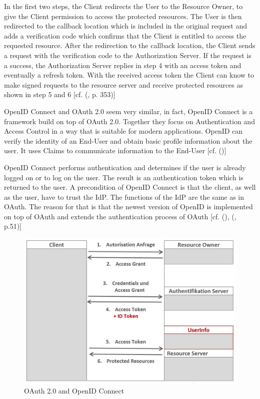 {{{	In the first two steps, the Client redirects the User to the Resource Owner, to give the Client permission to access the protected resources. The User is then redirected to the callback location which is included in the original request and adds a verification code which confirms that the Client is entitled to access the requested resource. After the redirection to the callback location, the Client sends a request with the verification code to the Authorization Server. If the request is a success, the Authorization Server replies in step 4 with an access token and eventually a refresh token. With the received access token the Client can know to make signed requests to the resource server and receive protected resources as shown in step 5 and 6 [cf. (\cite{LeBlanc:2011:SocialApplications}, p. 353)]
	
	OpenID Connect and OAuth 2.0 seem very similar, in fact, OpenID Connect is a framework build on top of OAuth 2.0. Together they focus on Authentication and Access Control in a way that is suitable for modern applications. OpenID can verify the identity of an End-User and obtain basic profile information about the user. It uses Claims to communicate information to the End-User [cf. (\cite{Sakimura:2014:OpenIDConnect})]
	
	OpenID Connect performs authentication and determines if the user is already logged on or to log on the user. The result is an authentication token which is returned to the user. A precondition of OpenID Connect is that the client, as well as the user, have to trust the IdP. The functions of the IdP are the same as in OAuth. The reason for that is that the newest version of OpenID is implemented on top of OAuth and extends the authentication process of OAuth  [cf. (\cite{Sakimura:2014:OpenIDConnect}), (\cite{Boyd:2012:GSOAuth}, p.51)]
	
	\begin{figure}[h]
		\centering
		\includegraphics[width=0.8\linewidth]{images/openid-process}
		\caption{OAuth 2.0 and OpenID Connect \cite{Lodderstedt:2014:OpenID}}
		\label{fig:openid-process}
	\end{figure}
	
}}}
